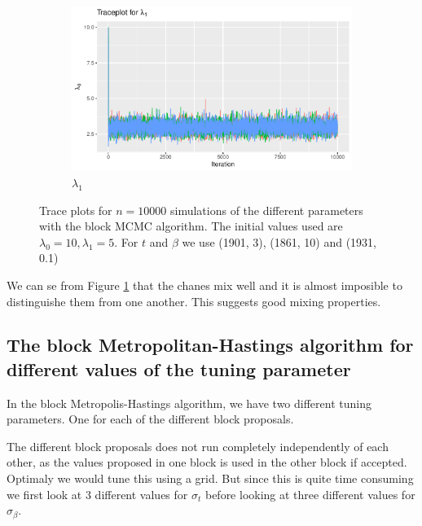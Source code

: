 \begin{figure}[H]
\begin{subfigure}[b]{0.49\textwidth}
    \end{subfigure}
    \begin{subfigure}[b]{0.49\textwidth}
        \centering
        \includegraphics[width = \textwidth]{Images/mixing_lambda_1_block.pdf}
        \caption{$\lambda_1$}

    \end{subfigure}
    \caption{Trace plots for $n = 10000$ simulations of the different parameters with the block MCMC algorithm. The initial values used are $\lambda_0 = 10, \lambda_1 = 5$. For $t$ and $\beta$ we use (1901, 3), (1861, 10) and (1931, 0.1) }
    \label{fig:mixing_blockMH}
\end{figure}


We can se from Figure \ref{fig:mixing_blockMH} that the chanes mix well and it is almost imposible to distinguishe them from one another. This suggests good mixing properties. 


\subsection{The block Metropolitan-Hastings algorithm for different values of the tuning parameter}

In the block Metropolis-Hastings algorithm, we have two different tuning parameters. One for each of the different block proposals. 

The different block proposals does not run completely independently of each other, as the values proposed in one block is used in the other block if accepted. Optimaly we would tune this using a grid. But since this is quite time consuming we first look at 3 different values for $\sigma_t$ before looking at three different values for $\sigma_{\beta}$.



